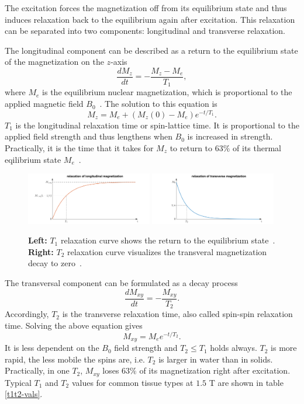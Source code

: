 The excitation forces the magnetization off from its equilibrium state and thus induces relaxation back to the equilibrium again after excitation.
This relaxation can be separated into two components: longitudinal and transverse relaxation.

The longitudinal component can be described as a return to the equilibrium state of the magnetization on the $z$-axis
\[ \frac{d M_z}{d t} = - \frac{M_z - M_e}{T_1}, \]
where $M_e$ is the equilibrium nuclear magnetization, which is proportional to the applied magnetic field $B_0$~\autocite{nishimura}.
The solution to this equation is
\[  M_z = M_e + (M_z(0) - M_e) e^{-t / T_1}. \]
$T_1$ is the longitudinal relaxation time or spin-lattice time.
It is proportional to the applied field strength and thus lengthens when $B_0$ is increased in strength.
Practically, it is the time that it takes for $M_z$ to return to $63 \%$ of its thermal eqilibrium state $M_e$~\autocite{relaxation, lauterbur}.
   \begin{figure}[h]
      \begin{center}
         \includegraphics[keepaspectratio, width=0.49\textwidth]{img/t1.png}
         \includegraphics[keepaspectratio, width=0.49\textwidth]{img/t2.png}
      \end{center}
      \caption{
         \textbf{Left:} $T_1$ relaxation curve shows the return to the equilibrium state~\autocite{RelaxationlongitudinalmagnetizationSpinlatticerelaxationWikipedia-2024-05-01}.
         \textbf{Right:} $T_2$ relaxation curve visualizes the transveral magnetization decay to zero~\autocite{RelaxationtransversemagnetizationSpinspinrelaxationWikipedia-2024-05-01}.
      }
      \label{relaxations}
   \end{figure}

The transversal component can be formulated as a decay process
\[ \frac{d M_{xy}}{d t} = - \frac{M_{xy}}{T_2}. \]
Accordingly, $T_2$ is the transverse relaxation time, also called spin-spin relaxation time.
Solving the above equation gives
\[ M_{xy} = M_e e^{-t / T_2}. \]
It is less dependent on the $B_0$ field strength and $T_2 \leq T_1$ holds always.
$T_2$ is more rapid, the less mobile the spins are, i.e. $T_2$ is larger in water than in solids.
Practically, in one $T_2$, $M_{xy}$ loses $63 \%$ of its magnetization right after excitation.
Typical $T_1$ and $T_2$ values for common tissue types at $1.5$ T are shown in table \ref{t1t2-vals}.

